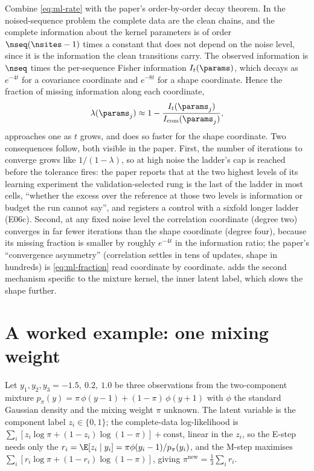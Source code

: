 Combine \cref{eq:ml-rate} with the paper's order-by-order decay theorem. In the
noised-sequence problem
the complete data are the clean chains, and the complete information about the kernel
parameters is of order $\nseq(\nsites-1)$ times a constant that does not depend on the
noise level, since it is the information the clean transitions carry. The observed
information is $\nseq$ times the per-sequence Fisher information $I_t(\params)$, which
decays as $e^{-4t}$ for a covariance coordinate and $e^{-8t}$ for a shape coordinate.
Hence the fraction of missing information along each coordinate,
\begin{equation}
  \lambda(\params_j)\approx1-\frac{I_t(\params_j)}{I_{\mathrm{com}}(\params_j)},
  \label{eq:ml-fraction}
\end{equation}
approaches one as $t$ grows, and does so faster for the shape coordinate. Two
consequences follow, both visible in the paper. First, the number of iterations to
converge grows like $1/(1-\lambda)$, so at high noise the ladder's cap is reached
before the tolerance fires: the paper reports that at the two highest levels of its
learning experiment the validation-selected rung is the last of the ladder in most
cells, ``whether the excess over the reference at those two levels is information or
budget the run cannot say'', and registers a control with a sixfold longer ladder
(E06c). Second, at any fixed noise level the correlation coordinate (degree two)
converges in far fewer iterations than the shape coordinate (degree four), because
its missing fraction is smaller by roughly $e^{-4t}$ in the information ratio; the
paper's ``convergence asymmetry'' (correlation settles in tens of updates, shape in
hundreds) is \cref{eq:ml-fraction} read coordinate by coordinate.
 adds the second mechanism specific to the mixture kernel,
the inner latent label, which slows the shape further.

\section{A worked example: one mixing weight}

Let $y_1,y_2,y_3=-1.5,\ 0.2,\ 1.0$ be three observations from the two-component
mixture $p_\pi(y)=\pi\,\phi(y-1)+(1-\pi)\,\phi(y+1)$ with $\phi$ the standard Gaussian
density and the mixing weight $\pi$ unknown. The latent variable is the component
label $z_i\in\{0,1\}$; the complete-data log-likelihood is
$\sum_i[z_i\log\pi+(1-z_i)\log(1-\pi)]+\text{const}$, linear in the $z_i$, so the E-step
needs only the  $r_i=\E[z_i\mid y_i]=\pi\phi(y_i-1)/p_\pi(y_i)$, and
the M-step maximises $\sum_i[r_i\log\pi+(1-r_i)\log(1-\pi)]$, giving
$\pi^{\mathrm{new}}=\tfrac13\sum_ir_i$.

